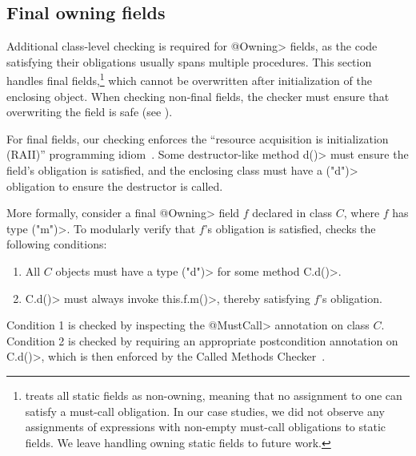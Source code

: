 

\subsection{Final owning fields}
\label{sec:owning-fields}

  Additional class-level checking is required for \<@Owning>
  fields, as the code
  satisfying their \MustCall obligations usually spans multiple
  procedures.  This section handles final fields,\footnote{\Tool
    treats all static fields as non-owning, meaning that no assignment to one
    can satisfy a must-call obligation. In our case studies, we did
    not observe any assignments of expressions with non-empty must-call obligations
    to static fields. We leave handling owning static fields to future work.
  }
  which cannot be overwritten after initialization of the enclosing
  object.  When checking
  non-final fields, the checker must ensure
  that overwriting the field is safe
  (see ).

  For final fields, our checking enforces the ``resource acquisition is
  initialization (RAII)'' programming idiom~\cite{raii}.  Some
  destructor-like method \<d()> must ensure the field's \MustCall obligation is
  satisfied, and the enclosing class must have a \MustCall\<("d")> obligation to
  ensure the destructor is called.

  More formally, consider a final \<@Owning> field $f$ declared in class $C$,
  where
  $f$ has type \MustCall\<("m")>.  To modularly
  verify that $f$'s \MustCall obligation is satisfied, \tool checks the following
  conditions:
  \begin{enumerate}
    \item All $C$ objects must have a type \MustCall\<("d")> for some method \<C.d()>.
    \item \<C.d()> must always invoke \<this.f.m()>, thereby satisfying $f$'s
    \MustCall obligation.
  \end{enumerate}
  Condition 1 is checked by inspecting the \<@MustCall> annotation on class $C$.
  Condition 2 is checked by requiring an appropriate \EnsuresCalledMethods
  postcondition annotation on \<C.d()>, which is then enforced by the Called
  Methods Checker~\cite{KelloggRSSE2020}.



